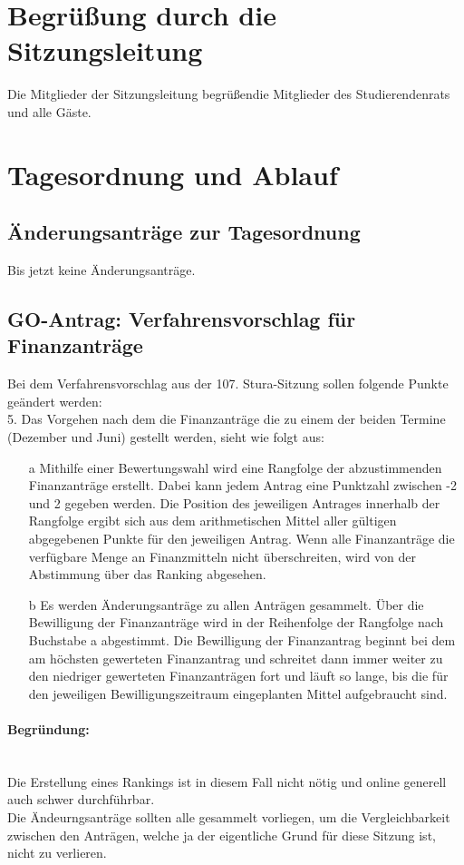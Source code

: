 \section{Begrüßung durch die Sitzungsleitung}
Die Mitglieder  der  Sitzungsleitung begrüßendie  Mitglieder  des  Studierendenrats  und  alle Gäste.

\section{Tagesordnung und Ablauf}
\tableofcontents
\subsection{Änderungsanträge zur Tagesordnung}
Bis jetzt keine Änderungsanträge.%
\subsection{GO-Antrag: Verfahrensvorschlag für Finanzanträge}

Bei dem Verfahrensvorschlag aus der 107. Stura-Sitzung sollen folgende Punkte geändert werden:\\[1em]
5. Das Vorgehen nach dem die Finanzanträge die zu einem der beiden Termine (Dezember und Juni) gestellt werden, sieht wie folgt aus:\\
\begin{itemize}
    \item[a] Mithilfe  einer  Bewertungswahl  wird  eine  Rangfolge  der  abzustimmenden Finanzanträge erstellt. Dabei kann jedem Antrag eine Punktzahl zwischen -2 und 2  gegeben  werden.    Die  Position  des  jeweiligen  Antrages  innerhalb  der Rangfolge ergibt sich aus dem arithmetischen Mittel aller gültigen abgegebenen Punkte für den jeweiligen Antrag. Wenn alle Finanzanträge die verfügbare Menge an Finanzmitteln nicht überschreiten, wird von der Abstimmung über das Ranking abgesehen.
    \item[b] Es werden Änderungsanträge zu allen Anträgen gesammelt. Über die Bewilligung der Finanzanträge wird in der Reihenfolge der Rangfolge nach  Buchstabe  a  abgestimmt.  Die  Bewilligung  der  Finanzantrag  beginnt  bei dem am höchsten gewerteten Finanzantrag und schreitet dann immer weiter zu den niedriger gewerteten Finanzanträgen fort und läuft so lange, bis die für den jeweiligen Bewilligungszeitraum eingeplanten Mittel aufgebraucht sind.
\end{itemize}
\paragraph{Begründung:}\phantom{spacer}\\
Die Erstellung eines Rankings ist in diesem Fall nicht nötig und online generell auch schwer durchführbar.\\
Die Ändeurngsanträge sollten alle gesammelt vorliegen, um die Vergleichbarkeit zwischen den Anträgen, welche ja der eigentliche Grund für diese Sitzung ist, nicht zu verlieren.\\

